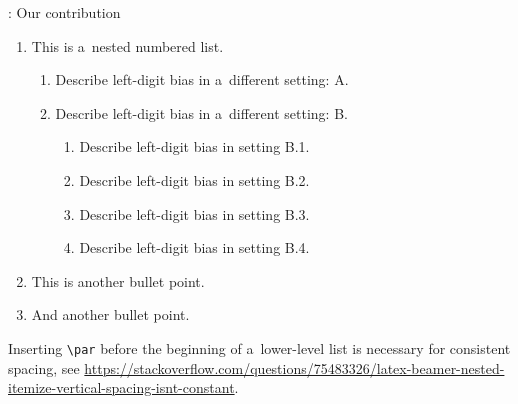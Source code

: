 \documentclass[aspectratio = 169, t, 10pt]{beamer}
\begin{document}
\begin{frame}{\insertsection: Our contribution}

\begin{enumerate}
	\item This is a~nested numbered list. \par
	\begin{enumerate}
		\item Describe left-digit bias in a~different setting: A.
		\item Describe left-digit bias in a~different setting: B. \par
			\begin{enumerate}
				\item Describe left-digit bias in setting B.1.
				\item Describe left-digit bias in setting B.2.
				\item Describe left-digit bias in setting B.3.
				\item Describe left-digit bias in setting B.4.
			\end{enumerate}
	\end{enumerate}
	\item This is another bullet point.
	\item And another bullet point.
\end{enumerate}

\small
Inserting \texttt{\textbackslash par} before the beginning of a~lower-level list is necessary for consistent spacing, see \url{https://stackoverflow.com/questions/75483326/latex-beamer-nested-itemize-vertical-spacing-isnt-constant}.

\end{frame}
\end{document}
